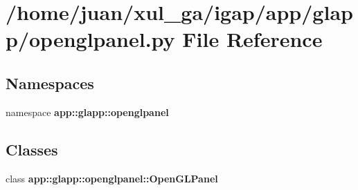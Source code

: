 \section{/home/juan/xul\_\-ga/igap/app/glapp/openglpanel.py File Reference}
\label{glapp_2openglpanel_8py}
\subsection*{Namespaces}
\begin{CompactItemize}
\item 
namespace {\bf app::glapp::openglpanel}
\end{CompactItemize}
\subsection*{Classes}
\begin{CompactItemize}
\item 
class {\bf app::glapp::openglpanel::OpenGLPanel}
\end{CompactItemize}
